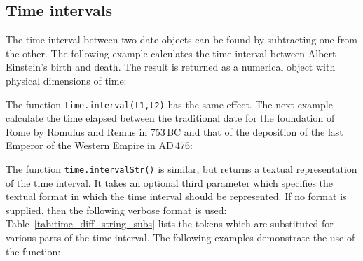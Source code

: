 
\subsection{Time intervals}

The time interval between two date objects can be found by subtracting one from
the other.  The following example calculates the time interval between Albert
Einstein's birth and death. The result is returned as a numerical object with
physical dimensions of time:

\vspace{3mm}

\vspace{3mm}

The function {\tt time.interval(t1,t2)} has the same effect.  The next example
calculate the time elapsed between the traditional date for the foundation of
Rome by Romulus and Remus in 753\,{\footnotesize BC} and that of the deposition
of the last Emperor of the Western Empire in {\footnotesize AD}\,476:

\vspace{3mm}

\vspace{3mm}

The function {\tt time.intervalStr()} is similar, but returns a textual
representation of the time interval.  It takes an optional third parameter
which specifies the textual format in which the time interval should be
represented. If no format is supplied, then the following verbose format is
used:
\vspace{3mm}\newline
{}
\vspace{3mm}\newline
Table~\ref{tab:time_diff_string_subs} lists the tokens which are substituted
for various parts of the time interval. The following examples demonstrate the
use of the function:

